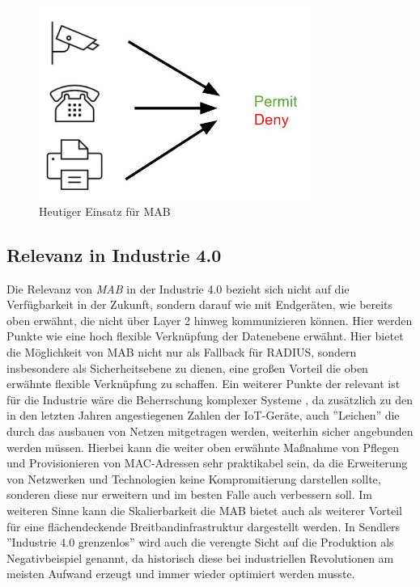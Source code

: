 \documentclass[conference]{IEEEtran}
\begin{document}
\begin{figure}[hbt]
	\centering
	\includegraphics[width=9cm]{figures/MAB_heutiger_Einsatz}
	\caption{Heutiger Einsatz für MAB}
	\label{fig:mab-today}
\end{figure}

\vspace{.5em}
\subsection{Relevanz in Industrie 4.0}
Die Relevanz von \emph{MAB} in der Industrie 4.0 bezieht sich nicht auf die Verfügbarkeit in der Zukunft, sondern darauf wie mit Endgeräten, wie bereits oben erwähnt, die nicht über Layer 2 hinweg kommunizieren können. Hier werden Punkte wie  eine hoch flexible Verknüpfung der Datenebene \cite{hirsch2014wandel} erwähnt. Hier bietet die Möglichkeit von MAB nicht nur als Fallback für RADIUS, sondern insbesondere als Sicherheitsebene zu dienen, eine großen Vorteil die oben erwähnte flexible Verknüpfung zu schaffen. Ein weiterer Punkte der relevant ist für die Industrie wäre die Beherrschung komplexer Systeme \cite{botthof2015zukunft}, da zusätzlich zu den in den letzten Jahren angestiegenen Zahlen der IoT-Geräte, auch ''Leichen'' die durch das ausbauen von Netzen mitgetragen werden, weiterhin sicher angebunden werden müssen. Hierbei kann die weiter oben erwähnte Maßnahme von Pflegen und Provisionieren von MAC-Adressen sehr praktikabel sein, da die Erweiterung von Netzwerken und Technologien keine Kompromitierung darstellen sollte, sonderen diese nur erweitern und im besten Falle auch verbessern soll. Im weiteren Sinne kann die Skalierbarkeit die MAB bietet auch als weiterer Vorteil für eine flächendeckende Breitbandinfrastruktur \cite{botthof2015zukunft} dargestellt werden. In  Sendlers ''Industrie 4.0 grenzenlos'' wird auch die verengte Sicht auf die Produktion als Negativbeispiel genannt\cite{sendler2016industrie}, da historisch diese bei industriellen Revolutionen am meisten Aufwand erzeugt und immer wieder optimiert werden musste.\\
\end{document}
